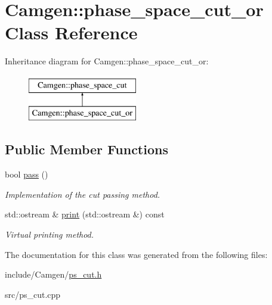 \hypertarget{a00422}{}\section{Camgen\+:\+:phase\+\_\+space\+\_\+cut\+\_\+or Class Reference}
\label{a00422}
Inheritance diagram for Camgen\+:\+:phase\+\_\+space\+\_\+cut\+\_\+or\+:\begin{figure}[H]
\begin{center}
\leavevmode
\includegraphics[height=2.000000cm]{a00422}
\end{center}
\end{figure}
\subsection*{Public Member Functions}
\begin{DoxyCompactItemize}
\item 
\hypertarget{a00422_a2ee4083a376cf1fdb0f904d4e9186cfe}{}bool \hyperlink{a00422_a2ee4083a376cf1fdb0f904d4e9186cfe}{pass} ()\label{a00422_a2ee4083a376cf1fdb0f904d4e9186cfe}

\begin{DoxyCompactList}\small\item\em Implementation of the cut passing method. \end{DoxyCompactList}\item 
\hypertarget{a00422_ac485366433b5eda88b2eebb41505e06e}{}std\+::ostream \& \hyperlink{a00422_ac485366433b5eda88b2eebb41505e06e}{print} (std\+::ostream \&) const \label{a00422_ac485366433b5eda88b2eebb41505e06e}

\begin{DoxyCompactList}\small\item\em Virtual printing method. \end{DoxyCompactList}\end{DoxyCompactItemize}


The documentation for this class was generated from the following files\+:\begin{DoxyCompactItemize}
\item 
include/\+Camgen/\hyperlink{a00741}{ps\+\_\+cut.\+h}\item 
src/ps\+\_\+cut.\+cpp\end{DoxyCompactItemize}

